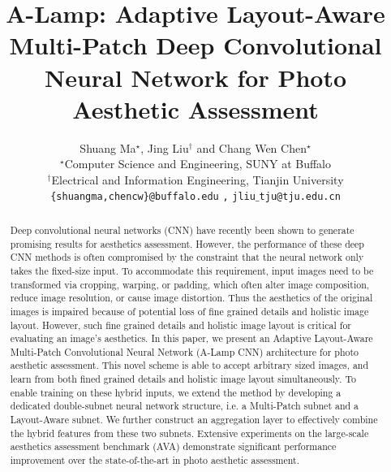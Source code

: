 \documentclass[10pt,twocolumn,letterpaper]{article}
\begin{document}
	
	\title{A-Lamp: Adaptive Layout-Aware Multi-Patch Deep Convolutional Neural Network for Photo Aesthetic Assessment}
	
		
	\author{Shuang Ma{$^\star$},
		Jing Liu{$^\dagger$} and
		Chang Wen Chen{$^\star$}\\
		{$^\star$}Computer Science and Engineering, SUNY at Buffalo\\ {$^\dagger$}Electrical and Information Engineering, Tianjin University\\
		{\tt\small \{shuangma,chencw\}@buffalo.edu} {\tt\small,} {\tt\small jliu$\_$tju@tju.edu.cn}
	}
%	
	\maketitle
	\begin{abstract}			
		Deep convolutional neural networks (CNN) have recently been shown to generate promising results for aesthetics assessment. However, the performance of these deep CNN methods is often compromised by the constraint that the neural network only takes the fixed-size input. To accommodate this requirement, input images need to be transformed via cropping, warping, or padding, which often alter image composition, reduce image resolution, or cause image distortion. Thus the aesthetics of the original images is impaired because of potential loss of fine grained details and holistic image layout. However, such fine grained details and holistic image layout is critical for evaluating an image's aesthetics. 
		In this paper, we present an Adaptive Layout-Aware Multi-Patch Convolutional Neural Network (A-Lamp CNN) architecture for photo aesthetic assessment. This novel scheme is able to accept arbitrary sized images, and learn from both fined grained details and holistic image layout simultaneously. To enable training on these hybrid inputs, we extend the method by developing a dedicated double-subnet neural network structure, i.e. a Multi-Patch subnet and a Layout-Aware subnet. We further construct an aggregation layer to effectively combine the hybrid features from these two subnets. Extensive experiments on the large-scale aesthetics assessment benchmark (AVA) demonstrate significant performance improvement over the state-of-the-art in photo aesthetic assessment.
		
	\end{abstract}
	
\end{document}
